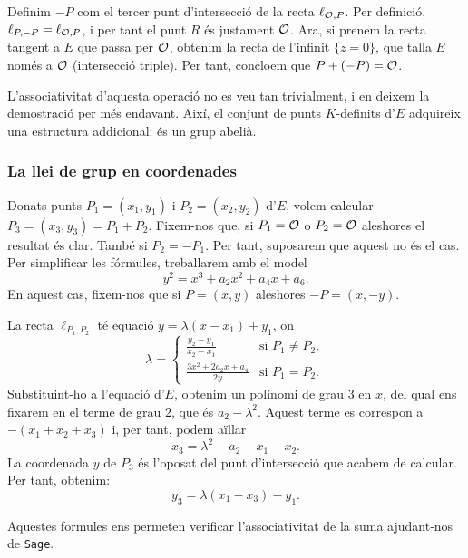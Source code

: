 Definim $-P$ com el tercer punt d'intersecció de la recta $\ell_{\mathcal{O}, P}$. Per definició, $\ell_{P,-P} = \ell_{\mathcal{O}, P}$, i per tant el punt $R$ és justament $\mathcal{O}$. Ara, si prenem la recta tangent a $E$ que passa per $\mathcal{O}$, obtenim la recta de l'infinit $\{ z=0\}$, que talla $E$ només a $\mathcal{O}$ (intersecció triple). Per tant, concloem que $P+(-P)=\mathcal{O}$.

L'associativitat d'aquesta operació no es veu tan trivialment, i en deixem la demostració per més endavant. Així, el conjunt de punts $K$-definits d'$E$ adquireix una estructura addicional: és un grup abelià.

\subsubsection{La llei de grup en coordenades}
Donats punts $P_1=(x_1,y_1)$ i $P_2=(x_2,y_2)$ d'$E$, volem calcular $P_3=(x_3,y_3)=P_1+P_2$. Fixem-nos que, si $P_1=\mathcal{O}$ o $P_2=\mathcal{O}$ aleshores el resultat és clar. També si $P_2=-P_1$. Per tant, suposarem que aquest no és el cas. Per simplificar les fórmules, treballarem amb el model
\[
y^2=x^3+a_2x^2+a_4x + a_6.
\]
En aquest cas, fixem-nos que si $P=(x,y)$ aleshores $-P=(x,-y)$.

La recta $\ell_{P_1,P_2}$ té equació $y = \lambda (x-x_1) + y_1$, on
\[
\lambda=\begin{cases}
\frac{y_2-y_1}{x_2-x_1}&\text{si } P_1\neq P_2,\\
\frac{3x^2+2a_2x + a_4}{2y}&\text{si } P_1=P_2.
\end{cases}
\]
Substituint-ho a l'equació d'$E$, obtenim un polinomi de grau $3$ en $x$, del qual ens fixarem en el terme de grau $2$, que és $a_2-\lambda^2$. Aquest terme es correspon a $-(x_1+x_2+x_3)$ i, per tant, podem aïllar
\[
x_3 = \lambda^2-a_2-x_1-x_2.
\]
La coordenada $y$ de $P_3$ és l'oposat del punt d'intersecció que acabem de calcular. Per tant, obtenim:
\[
y_3 = \lambda (x_1-x_3)-y_1.
\]

Aquestes formules ens permeten verificar l'associativitat de la suma ajudant-nos de \texttt{Sage}.


